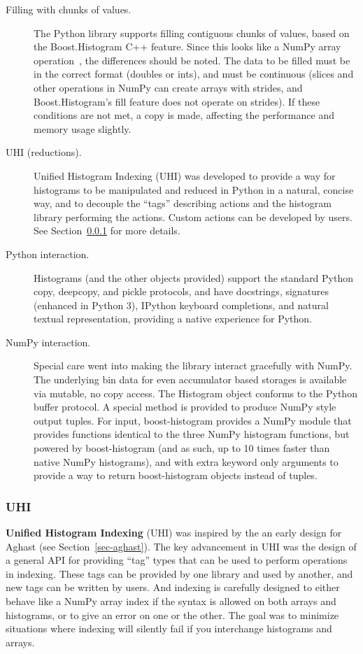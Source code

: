 \documentclass{webofc}
\begin{document}
\begin{description}
\item[Filling with chunks of values.] The Python library supports filling contiguous chunks of values, based on the Boost.Histogram C++ feature. Since this looks like a NumPy array operation~\cite{walt2011numpy}, the differences should be noted. The data to be filled must be in the correct format (doubles or ints), and must be continuous (slices and other operations in NumPy can create arrays with strides, and Boost.Histogram's fill feature does not operate on strides). If these conditions are not met, a copy is made, affecting the performance and memory usage slightly.
\item[UHI (reductions).] Unified Histogram Indexing (UHI) was developed to provide a way for histograms to be manipulated and reduced in Python in a natural, concise way, and to decouple the ``tags'' describing actions and the histogram library performing the actions. Custom actions can be developed by users. See Section~\ref{sec-bhp-uhi} for more details.
\item[Python interaction.] Histograms (and the other objects provided) support the standard Python copy, deepcopy, and pickle protocols, and have docstrings, signatures (enhanced in Python 3), IPython keyboard completions, and natural textual representation,  providing a native experience for Python.
\item[NumPy interaction.] Special care went into making the library interact gracefully with NumPy. The underlying bin data for even accumulator based storages is available via mutable, no copy access. The Histogram object conforms to the Python buffer protocol. A special method is provided to produce NumPy style output tuples. For input, boost-histogram provides a NumPy module that provides functions identical to the three NumPy histogram functions, but powered by boost-histogram (and as such, up to 10 times faster than native NumPy histograms), and with extra keyword only arguments to provide a way to return boost-histogram objects instead of tuples.

\end{description}


\subsubsection{UHI}
\label{sec-bhp-uhi}

\textbf{Unified Histogram Indexing} (UHI) was inspired by the an early design for Aghast (see Section~\ref{sec-aghast}). The key advancement in UHI was the design of a general API for providing ``tag'' types that can be used to perform operations in indexing. These tags can be provided by one library and used by another, and new tags can be written by users. And indexing is carefully designed to either behave like a NumPy array index if the syntax is allowed on both arrays and histograms, or to give an error on one or the other. The goal was to minimize situations where indexing will silently fail if you interchange histograms and arrays.
\end{document}
